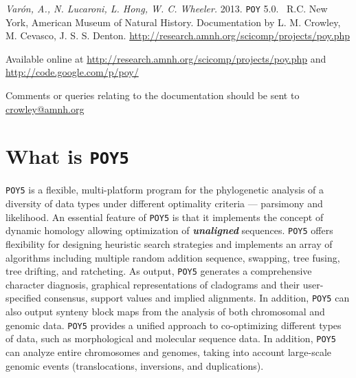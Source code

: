 \documentclass[11pt]{book}
\newcommand{\commandstyle}[1]{\texttt{#1}}
\newcommand{\poy}{\commandstyle{POY5}\xspace}
\begin{document}
\begin{flushleft}
\vspace*{0.25cm}
\emph{Var\'on, A., N. Lucaroni, L. Hong, W. C. Wheeler.} 2013. \texttt{POY} 5.0. \buildnumber\ R.C. New York, 
American Museum of Natural History. Documentation by L. M. Crowley, M. Cevasco, J. S. S. Denton. 
\url{http://research.amnh.org/scicomp/projects/poy.php}

\vspace*{0.25cm}

Available online at
\url{http://research.amnh.org/scicomp/projects/poy.php}
and
\url{http://code.google.com/p/poy/} 

Comments or queries relating to the documentation should be sent to \href{mailto:crowley@amnh.org}{crowley@amnh.org}
\end{flushleft}

\tableofcontents


\chapter{What is \poy}

\poy is a flexible, multi-platform program for the phylogenetic analysis of a diversity of data types under different optimality criteria ---
parsimony and likelihood.
An essential feature of \poy is that it implements the concept of dynamic homology \cite{wheeler2001a, wheeler2001} allowing 
optimization of   {\bf \emph{unaligned}} sequences. \poy offers flexibility for designing heuristic search strategies and implements an array of 
algorithms including multiple random addition sequence, swapping, tree fusing, tree drifting, and ratcheting. As output, \poy 
generates a comprehensive character diagnosis, graphical representations of cladograms and their user-specified consensus, 
support values and implied alignments.  In addition, \poy can also output synteny block maps from the analysis of both 
chromosomal and genomic data. \poy provides a unified approach to co-optimizing different types of data, such as morphological 
and molecular sequence data. In addition, \poy can analyze entire chromosomes and genomes, taking into account large-scale 
genomic events (translocations, inversions, and duplications).
\end{document}
